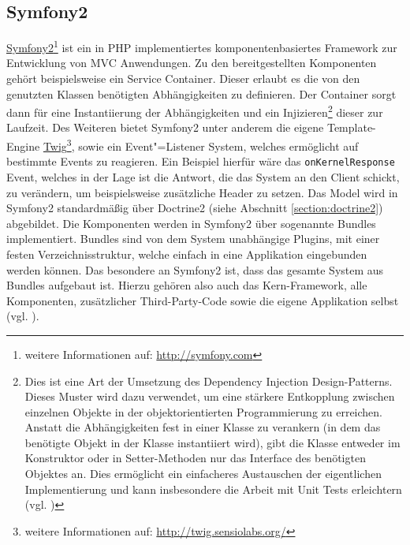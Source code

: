 \subsection{Symfony2}\label{section:symfony2}
\href{http://symfony.com}{Symfony2}\footnote{weitere Informationen auf: \url{http://symfony.com}} ist ein in \ac{PHP} implementiertes komponenten\allowbreak basiertes Framework zur Entwicklung von \ac{MVC} Anwendungen. Zu den bereitgestellten Komponenten gehört beispielsweise ein Service Container. Dieser erlaubt es die von den genutzten Klassen benötigten Abhängigkeiten zu definieren. Der Container sorgt dann für eine Instantiierung der Abhängigkeiten und ein Injizieren\footnote{Dies ist eine Art der Umsetzung des Dependency Injection Design-Patterns. Dieses Muster wird dazu verwendet, um eine stärkere Entkopplung zwischen einzelnen Objekte in der objektorientierten Programmierung zu erreichen. Anstatt die Abhängigkeiten fest in einer Klasse zu verankern (in dem das benötigte Objekt in der Klasse instantiiert wird), gibt die Klasse entweder im Konstruktor oder in Setter-Methoden nur das Interface des benötigten Objektes an. Dies ermöglicht ein einfacheres Austauschen der eigentlichen Implementierung und kann insbesondere die Arbeit mit Unit Tests erleichtern (vgl. \cite{Fowler2004})} dieser zur Laufzeit. Des Weiteren bietet Symfony2 unter anderem die eigene Template-Engine \href{http://twig.sensiolabs.org/}{Twig}\footnote{weitere Informationen auf: \url{http://twig.sensiolabs.org/}}, sowie ein Event"=Listener System, welches ermöglicht auf bestimmte Events zu reagieren. Ein Beispiel hierfür wäre das \texttt{onKernelResponse} Event, welches in der Lage ist die Antwort, die das System an den Client schickt, zu verändern, um beispielsweise zusätzliche Header zu setzen. Das Model wird in Symfony2 standardmäßig über Doctrine2 (siehe Abschnitt \ref{section:doctrine2}) abgebildet.
Die Komponenten werden in Symfony2 über sogenannte Bundles implementiert. Bundles sind von dem System unabhängige Plugins, mit einer festen Verzeichnisstruktur, welche einfach in eine Applikation eingebunden werden können. Das besondere an Symfony2 ist, dass das gesamte System aus Bundles aufgebaut ist. Hierzu gehören also auch das Kern-Framework, alle Komponenten, zusätzlicher Third-Party-Code sowie die eigene Applikation selbst (vgl. \cite{Symfony2Bundles}).

